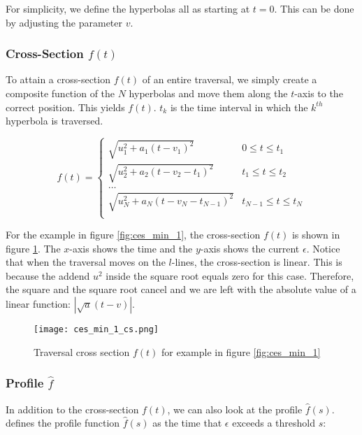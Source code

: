 For simplicity, we define the hyperbolas all as starting at $t=0$. This can be done by adjusting the parameter $v$.


\subsubsection{Cross-Section $f(t)$}

To attain a cross-section $f(t)$ of an entire traversal, we simply create a composite function of the $N$ hyperbolas and move them along the $t$-axis to the correct position. This yields $f(t)$. $t_k$ is the time interval in which the $k^{th}$ hyperbola is traversed.

\[ f(t) =
\begin{cases} 
	\sqrt{u_1^2 + a_1(t - v_1)^2} & 0 \leq t \leq t_1 \\
	\sqrt{u_2^2 + a_2(t - v_2 - t_1)^2} & t_1 \leq t \leq t_2 \\
	\dots \\
	\sqrt{u_N^2 + a_N(t - v_N - t_{N-1})^2} & t_{N-1} \leq t \leq t_N \\
\end{cases}
\]

For the example in figure \ref{fig:ces_min_1}, the cross-section $f(t)$ is shown in figure \ref{fig:ces_min_1_cs}. The $x$-axis shows the time and the $y$-axis shows the current $\epsilon$. Notice that when the traversal moves on the $l$-lines, the cross-section is linear. This is because the addend $u^2$ inside the square root equals zero for this case. Therefore, the square and the square root cancel and we are left with the absolute value of a linear function: $\left| \sqrt{a}(t - v) \right|$.

 \begin{figure}[H]
    \centering
    
    \texttt{[image: ces\_min\_1\_cs.png]}
		
	\caption{Traversal cross section $f(t)$ for example in figure \ref{fig:ces_min_1}\protect\footnotemark}
    \label{fig:ces_min_1_cs}
\end{figure}


\subsubsection{Profile $\hat{f}$}

In addition to the cross-section $f(t)$, we can also look at the profile $\hat{f}(s)$. \citeauthor{rotelex} defines the profile function $\hat{f}(s)$ as the time that $\epsilon$ exceeds a threshold $s$:

